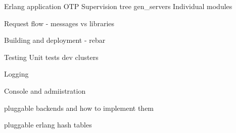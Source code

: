 Erlang application
  OTP
    Supervision tree
    gen\_servers
      Individual modules

Request flow - messages vs libraries

Building and deployment - rebar

Testing
  Unit tests
  dev clusters

Logging

Console and admiistration

pluggable backends and how to implement them

pluggable erlang hash tables

